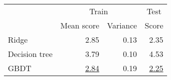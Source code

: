 \begin{tabular}{lrrr}
  \toprule
                & \multicolumn{2}{c}{Train} & \multicolumn{1}{c}{Test}
  \\
  \cmidrule(lr){2-4}

                & Mean score                & Variance                 & Score
  \\
  \midrule
  Ridge         & 2.85                      & 0.13                     & 2.35
  \\
  Decision tree & 3.79                      & 0.10                     & 4.53
  \\
  GBDT          & \underline{2.84}          & 0.19                     & \underline{2.25}
  \\
  \bottomrule
\end{tabular}
